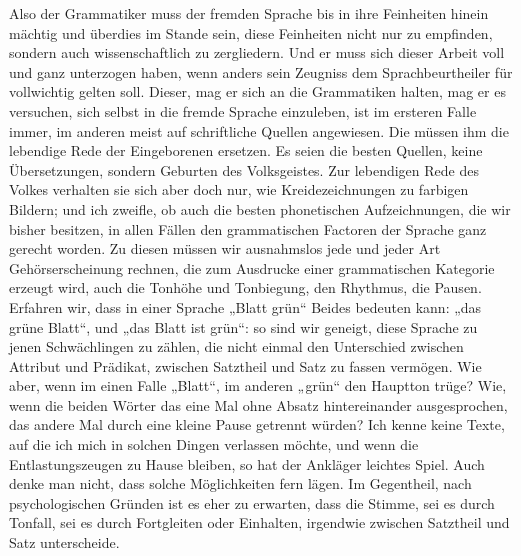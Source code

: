 Also der Grammatiker muss der fremden Sprache bis in ihre Feinheiten hinein mächtig und überdies im Stande sein, diese Feinheiten nicht nur zu empfinden, sondern auch wissenschaftlich zu zergliedern. Und er muss sich dieser Arbeit voll und ganz unterzogen haben, wenn anders sein Zeugniss dem Sprachbeurtheiler für vollwichtig gelten soll. Dieser, mag er sich an die Grammatiken halten, mag er es versuchen, sich selbst in die fremde Sprache einzuleben, ist im ersteren Falle immer, im anderen meist auf schriftliche Quellen angewiesen. Die müssen ihm die lebendige Rede der Eingeborenen ersetzen. Es seien die besten Quellen, keine Übersetzungen, sondern  Geburten des Volksgeistes. Zur lebendigen Rede des Volkes verhalten sie sich aber doch nur, wie Kreidezeichnungen zu farbigen Bildern; und ich zweifle, ob auch die besten phonetischen Aufzeichnungen, die wir bisher besitzen, in allen Fällen den grammatischen Factoren der Sprache ganz gerecht worden. Zu diesen müssen wir ausnahmslos jede und jeder Art Gehörserscheinung rechnen, die zum Ausdrucke einer grammatischen Kategorie erzeugt wird, auch die Tonhöhe und Tonbiegung, den Rhythmus, die Pausen. Erfahren wir, dass in einer Sprache „Blatt grün“ Beides bedeuten kann: „das grüne Blatt“, und „das Blatt ist grün“: so sind wir geneigt, diese Sprache zu jenen Schwächlingen zu zählen, die nicht einmal den Unterschied zwischen Attribut und Prädikat, zwischen Satztheil und Satz zu fassen vermögen. Wie aber, wenn im einen Falle „Blatt“, im anderen „grün“ den Hauptton trüge? Wie, wenn die beiden Wörter das eine Mal ohne Absatz hintereinander ausgesprochen, das andere Mal durch eine kleine Pause getrennt würden? Ich kenne keine Texte, auf die ich mich in solchen Dingen verlassen \label{sp.451} möchte, und wenn die Entlastungszeugen zu Hause bleiben, so hat der Ankläger leichtes Spiel. Auch denke man nicht, dass solche Möglichkeiten fern lägen. Im Gegentheil, nach psychologischen Gründen ist es eher zu erwarten, dass die Stimme, sei es durch Tonfall, sei es durch Fortgleiten oder Einhalten, irgendwie zwischen Satztheil und Satz unterscheide. 

